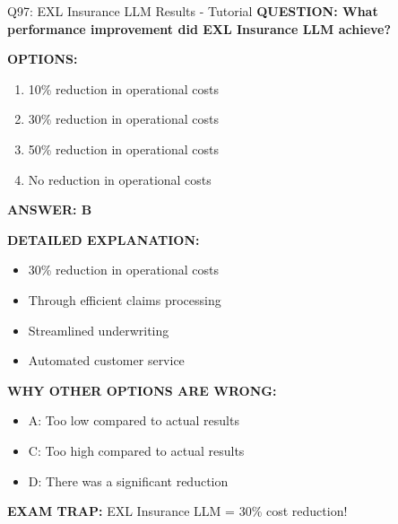 \documentclass[8pt]{beamer}
\begin{document}
	\begin{frame}{Q97: EXL Insurance LLM Results - Tutorial}
		\fontsize{6.5}{7.5}\selectfont
		\textbf{QUESTION: What performance improvement did EXL Insurance LLM achieve?}
		
		\vspace{0.1cm}
		\textbf{OPTIONS:}
		\begin{enumerate}
			\item 10\% reduction in operational costs
			\item 30\% reduction in operational costs
			\item 50\% reduction in operational costs
			\item No reduction in operational costs
		\end{enumerate}
		
		\vspace{0.1cm}
		\textcolor{myblue}{\textbf{ANSWER: B}}
		
		\vspace{0.1cm}
		\textbf{DETAILED EXPLANATION:}
		\begin{itemize}
			\item 30\% reduction in operational costs
			\item Through efficient claims processing
			\item Streamlined underwriting
			\item Automated customer service
		\end{itemize}
		
		\vspace{0.1cm}
		\textcolor{myred}{\textbf{WHY OTHER OPTIONS ARE WRONG:}}
		\begin{itemize}
			\item \textcolor{myred}{A:} Too low compared to actual results
			\item \textcolor{myred}{C:} Too high compared to actual results
			\item \textcolor{myred}{D:} There was a significant reduction
		\end{itemize}
		
		\textcolor{myred}{\textbf{EXAM TRAP:}} EXL Insurance LLM = \textcolor{myblue}{30\% cost reduction}!
	\end{frame}
	
\end{document}
